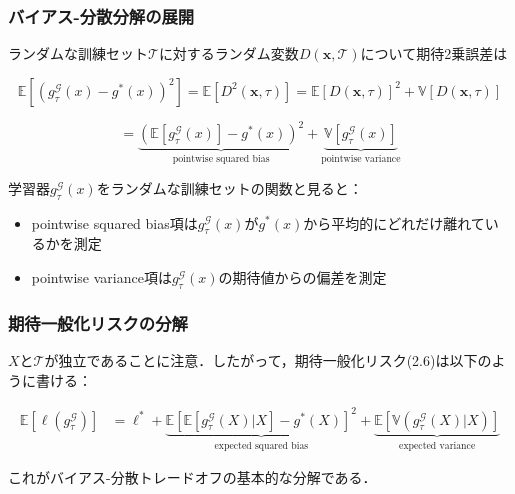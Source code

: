\documentclass[dvipdfmx,cjk]{beamer}
\theoremstyle{example}
\begin{document}
\begin{frame}
    \frametitle{バイアス-分散分解の展開}
    ランダムな訓練セット$\mathcal{T}$に対するランダム変数$D(\boldsymbol{x}, \mathcal{T})$について期待2乗誤差は

    \[
        \mathbb{E}[(g_\tau^{\mathcal{G}}(x) - g^*(x))^2] = \mathbb{E}\left[D^2(\boldsymbol{x},\tau)\right]={\mathbb{E}\left[D(\boldsymbol{x},\tau)\right]}^2+\mathbb{V}\left[D(\boldsymbol{x},\tau)\right]
    \]

    \[
        = \underbrace{(\mathbb{E}[g_\tau^{\mathcal{G}}(x)] - g^*(x))^2}_{\text{pointwise squared bias}} + \underbrace{\mathbb{V}[g_\tau^{\mathcal{G}}(x)]}_{\text{pointwise variance}} \tag{2.21}
    \]

    学習器$g_\tau^{\mathcal{G}}(x)$をランダムな訓練セットの関数と見ると：
    \begin{itemize}
        \item \alert{pointwise squared bias}項は$g_\tau^{\mathcal{G}}(x)$が$g^*(x)$から平均的にどれだけ離れているかを測定
        \item \alert{pointwise variance}項は$g_\tau^{\mathcal{G}}(x)$の期待値からの偏差を測定
    \end{itemize}
\end{frame}

\begin{frame}
    \frametitle{期待一般化リスクの分解}
    $X$と$\mathcal{T}$が独立であることに注意．したがって，期待一般化リスク(2.6)は以下のように書ける：

    \begin{align}
        \mathbb{E}[\ell(g_\tau^{\mathcal{G}})]
         & = \ell^* + \underbrace{\mathbb{E}\left[\mathbb{E}[g_\tau^{\mathcal{G}}(X) | X] - g^*(X)\right]^2}_\text{expected squared bias} + \underbrace{\mathbb{E}\left[\mathbb{V}(g_\tau^{\mathcal{G}}(X) | X)\right]}_\text{expected variance} \tag{2.22}
    \end{align}

    これが\alert{バイアス-分散トレードオフ}の基本的な分解である．
\end{frame}
\end{document}
